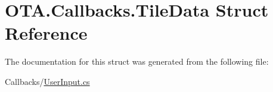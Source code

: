 \hypertarget{struct_o_t_a_1_1_callbacks_1_1_tile_data}{}\section{O\+T\+A.\+Callbacks.\+Tile\+Data Struct Reference}
\label{struct_o_t_a_1_1_callbacks_1_1_tile_data}


The documentation for this struct was generated from the following file\+:\begin{DoxyCompactItemize}
\item 
Callbacks/\hyperlink{_user_input_8cs}{User\+Input.\+cs}\end{DoxyCompactItemize}
